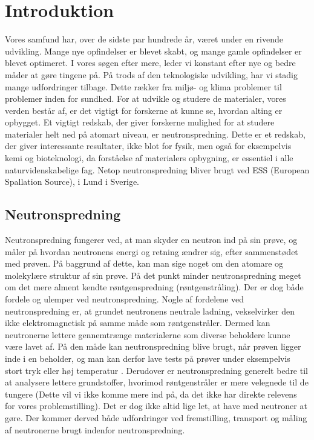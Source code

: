 \documentclass[12pt,oneside,a4paper]{article}
\begin{document}
{{{{{\begin{abstract}
\end{abstract}

\newpage

\tableofcontents

\newpage


\section{Introduktion}

Vores samfund har, over de sidste par hundrede år, været under en rivende udvikling. Mange nye opfindelser er blevet skabt, og mange gamle opfindelser er blevet optimeret. I vores søgen efter mere, leder vi konstant efter nye og bedre måder at gøre tingene på. På trods af den teknologiske udvikling, har vi stadig mange udfordringer tilbage. Dette rækker fra miljø- og klima problemer til problemer inden for sundhed. For at udvikle og studere de materialer, vores verden består af, er det vigtigt for forskerne at kunne se, hvordan alting er opbygget. Et vigtigt redskab, der giver forskerne mulighed for at studere materialer helt ned på atomart niveau, er neutronspredning. Dette er et redskab, der giver interessante resultater, ikke blot for fysik, men også for eksempelvis kemi og bioteknologi, da forståelse af materialers opbygning, er essentiel i alle naturvidenskabelige fag. Netop neutronspredning bliver brugt ved ESS (European Spallation Source), i Lund i Sverige. \cite{ess_folder}

\subsection{Neutronspredning}
Neutronspredning fungerer ved, at man skyder en neutron ind på sin prøve, og måler på hvordan neutronens energi og retning ændrer sig, efter sammenstødet med prøven. På baggrund af dette, kan man sige noget om den atomare og molekylære struktur af sin prøve. På det punkt minder neutronspredning meget om det mere alment kendte røntgenspredning (røntgenstråling). Der er dog både fordele og ulemper ved neutronspredning. Nogle af fordelene ved neutronspredning er, at grundet neutronens neutrale ladning, vekselvirker den ikke elektromagnetisk på samme måde som røntgenstråler. Dermed kan neutronerne lettere gennemtrænge materialerne som diverse beholdere kunne være lavet af. På den måde kan neutronspredning blive brugt, når prøven ligger inde i en beholder, og man kan derfor lave tests på prøver under eksempelvis stort tryk eller høj temperatur . Derudover er neutronspredning generelt bedre til at analysere lettere grundstoffer, hvorimod røntgenstråler er mere velegnede til de tungere (Dette vil vi ikke komme mere ind på, da det ikke har direkte relevens for vores problemstilling). Det er dog ikke altid lige let, at have med neutroner at gøre. Der kommer derved både udfordringer ved fremstilling, transport og måling af neutronerne brugt indenfor neutronspredning.

}}}}}
\end{document}
